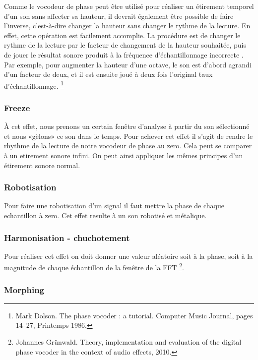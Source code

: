 Comme le vocodeur de phase peut être utilisé pour réaliser un étirement temporel d'un son sans affecter sa hauteur, il devrait également être possible de faire l'inverse, c’est-à-dire changer la hauteur sans changer le rythme de la lecture. En effet, cette opération est facilement accomplie. La procédure est de changer le rythme de la lecture par le facteur de changement de la hauteur souhaitée, puis de jouer le résultat sonore produit à la fréquence d'échantillonnage \guillemotleft incorrecte \guillemotright. Par exemple, pour augmenter la hauteur d’une octave, le son est d'abord agrandi d'un facteur de deux, et il est ensuite joué à deux fois l'original taux d'échantillonnage. \footnote{Mark Dolson. The phase vocoder : a tutorial. Computer Music Journal, pages 14–27, Printemps 1986.}


    \subsubsection{Freeze}

À cet effet, nous prenons un certain fenêtre d’analyse à partir du son sélectionné et nous «gèlons» ce son dans le temps. Pour achever cet effet il s'agit de rendre le rhythme de la lecture de notre vocodeur de phase au zero. Cela peut se comparer à un etirement sonore infini. On peut ainsi appliquer les mêmes principes d'un étirement sonore normal.

    \subsubsection{Robotisation}

Pour faire une robotisation d'un signal il faut mettre la phase de chaque echantillon à zero. Cet effet resulte à un son robotisé et métalique.

    \subsubsection{Harmonisation - chuchotement}

Pour réaliser cet effet on doit donner une valeur aléatoire soit à la phase, soit à la magnitude de chaque échantillon de la fenêtre de la FFT \footnote{Johannes Grünwald. Theory, implementation and evaluation of the digital phase vocoder in the context of audio effects, 2010.}.


    \subsubsection{Morphing}
    
